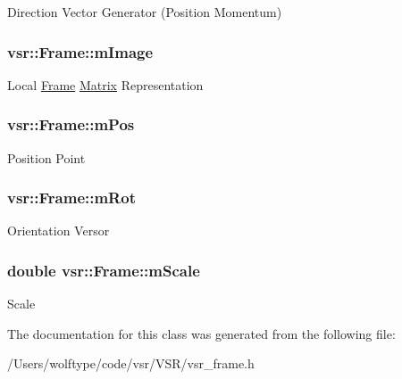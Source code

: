 Direction Vector Generator (Position Momentum) \hypertarget{classvsr_1_1_frame_a4f1d124a66bf0d62e3a1794776368a8d}{
\subsubsection[{m\-Image}]{ {\bf vsr\-::\-Frame\-::m\-Image}}}\label{classvsr_1_1_frame_a4f1d124a66bf0d62e3a1794776368a8d}
Local \hyperlink{classvsr_1_1_frame}{Frame} \hyperlink{classvsr_1_1_matrix}{Matrix} Representation \hypertarget{classvsr_1_1_frame_a85c31a1ec08d5e446f0d4ec86e182910}{
\subsubsection[{m\-Pos}]{ {\bf vsr\-::\-Frame\-::m\-Pos}}}\label{classvsr_1_1_frame_a85c31a1ec08d5e446f0d4ec86e182910}
Position Point \hypertarget{classvsr_1_1_frame_a4c88683dae16cc51985eac1f2cbf6864}{
\subsubsection[{m\-Rot}]{ {\bf vsr\-::\-Frame\-::m\-Rot}}}\label{classvsr_1_1_frame_a4c88683dae16cc51985eac1f2cbf6864}
Orientation Versor \hypertarget{classvsr_1_1_frame_aba7250cb48e33717a4244aa2c8bc86bf}{
\subsubsection[{m\-Scale}]{\setlength{\rightskip}{0pt plus 5cm}double {\bf vsr\-::\-Frame\-::m\-Scale}}}\label{classvsr_1_1_frame_aba7250cb48e33717a4244aa2c8bc86bf}
Scale 

The documentation for this class was generated from the following file\-:\begin{DoxyCompactItemize}
\item 
/\-Users/wolftype/code/vsr/\-V\-S\-R/vsr\-\_\-frame.\-h\end{DoxyCompactItemize}
